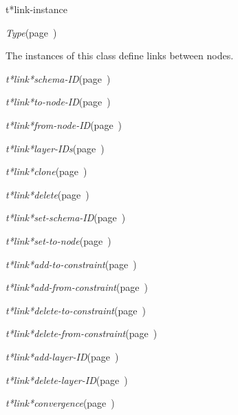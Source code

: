 \begin{description}
\item [Name:]  t*link-instance

\item [Layer:] {\sl Type}\hfill(page~\pageref{Type})

\item [Description:]

The instances of this class define links between nodes. 

\item [Attributes:]
\item {\sl t*link*schema-ID}\hfill(page~\pageref{t*link*schema-ID})
\item {\sl t*link*to-node-ID}\hfill(page~\pageref{t*link*to-node-ID})
\item {\sl t*link*from-node-ID}\hfill(page~\pageref{t*link*from-node-ID})
\item {\sl t*link*layer-IDs}\hfill(page~\pageref{t*link*layer-IDs})

\item [Operations:]
\item {\sl t*link*clone}\hfill(page~\pageref{t*link*clone})
\item {\sl t*link*delete}\hfill(page~\pageref{t*link*delete})
\item {\sl t*link*set-schema-ID}\hfill(page~\pageref{t*link*set-schema-ID})
\item {\sl t*link*set-to-node}\hfill(page~\pageref{t*link*set-to-node})
\item {\sl t*link*add-to-constraint}\hfill(page~\pageref{t*link*add-to-constraint})
\item {\sl t*link*add-from-constraint}\hfill(page~\pageref{t*link*add-from-constraint})
\item {\sl t*link*delete-to-constraint}\hfill(page~\pageref{t*link*delete-to-constraint})
\item {\sl t*link*delete-from-constraint}\hfill(page~\pageref{t*link*delete-from-constraint})
\item {\sl t*link*add-layer-ID}\hfill(page~\pageref{t*link*add-layer-ID})
\item {\sl t*link*delete-layer-ID}\hfill(page~\pageref{t*link*delete-layer-ID})
\item {\sl t*link*convergence}\hfill(page~\pageref{t*link*convergence})


\item [Subclasses:]


\item [Superclasses:]


\item [Instances:]



\end{description}
\horizontalline

